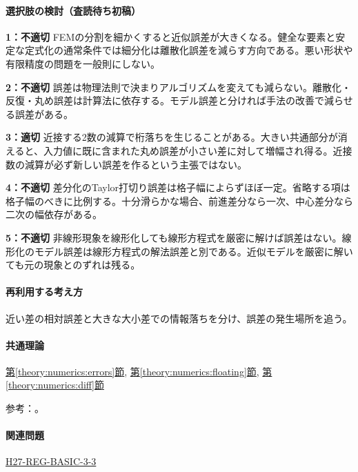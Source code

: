 \paragraph{選択肢の検討（査読待ち初稿）}\mbox{}\par

\noindent\textbf{1：不適切} FEMの分割を細かくすると近似誤差が大きくなる。健全な要素と安定な定式化の通常条件では細分化は離散化誤差を減らす方向である。悪い形状や有限精度の問題を一般則にしない。\par

\noindent\textbf{2：不適切} 誤差は物理法則で決まりアルゴリズムを変えても減らない。離散化・反復・丸め誤差は計算法に依存する。モデル誤差と分ければ手法の改善で減らせる誤差がある。\par

\noindent\textbf{3：適切} 近接する2数の減算で桁落ちを生じることがある。大きい共通部分が消えると、入力値に既に含まれた丸め誤差が小さい差に対して増幅され得る。近接数の減算が必ず新しい誤差を作るという主張ではない。\par

\noindent\textbf{4：不適切} 差分化のTaylor打切り誤差は格子幅によらずほぼ一定。省略する項は格子幅のべきに比例する。十分滑らかな場合、前進差分なら一次、中心差分なら二次の幅依存がある。\par

\noindent\textbf{5：不適切} 非線形現象を線形化しても線形方程式を厳密に解けば誤差はない。線形化のモデル誤差は線形方程式の解法誤差と別である。近似モデルを厳密に解いても元の現象とのずれは残る。\par

\paragraph{再利用する考え方} 近い差の相対誤差と大きな大小差での情報落ちを分け、誤差の発生場所を追う。

\paragraph{共通理論} \hyperref[theory:numerics:errors]{第\ref*{theory:numerics:errors}節}, \hyperref[theory:numerics:floating]{第\ref*{theory:numerics:floating}節}, \hyperref[theory:numerics:diff]{第\ref*{theory:numerics:diff}節}

\par 参考：\cite{goldberg1991,nist_differentiation,mit_roy_fea1999}。

\paragraph{関連問題} \hyperref[q:h27-reg-basic-3-3]{H27-REG-BASIC-3-3}

